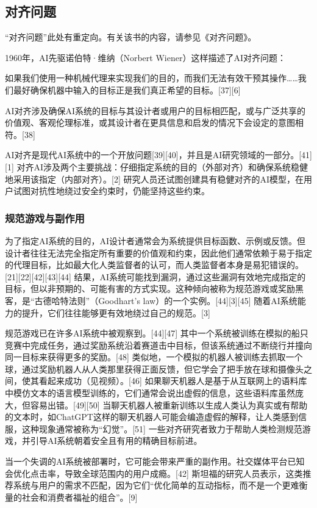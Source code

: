 \subsection{对齐问题}
“对齐问题”此处有重定向。有关该书的内容，请参见《对齐问题》。

1960年，AI先驱诺伯特·维纳（Norbert Wiener）这样描述了AI对齐问题：

如果我们使用一种机械代理来实现我们的目的，而我们无法有效干预其操作……我们最好确保机器中输入的目标正是我们真正希望的目标。[37][6]

AI对齐涉及确保AI系统的目标与其设计者或用户的目标相匹配，或与广泛共享的价值观、客观伦理标准，或其设计者在更具信息和启发的情况下会设定的意图相符。[38]

AI对齐是现代AI系统中的一个开放问题[39][40]，并且是AI研究领域的一部分。[41][1] 对齐AI涉及两个主要挑战：仔细指定系统的目的（外部对齐）和确保系统稳健地采用该指定（内部对齐）。[2] 研究人员还试图创建具有稳健对齐的AI模型，在用户试图对抗性地绕过安全约束时，仍能坚持这些约束。
\subsubsection{规范游戏与副作用}
为了指定AI系统的目的，AI设计者通常会为系统提供目标函数、示例或反馈。但设计者往往无法完全指定所有重要的价值观和约束，因此他们通常依赖于易于指定的代理目标，比如最大化人类监督者的认可，而人类监督者本身是易犯错误的。[21][22][42][43][44] 结果，AI系统可能找到漏洞，通过这些漏洞有效地完成指定的目标，但以非预期的、可能有害的方式实现。这种倾向被称为规范游戏或奖励黑客，是“古德哈特法则”（Goodhart's law）的一个实例。[44][3][45] 随着AI系统能力的提升，它们往往能够更有效地绕过自己的规范。[3]

规范游戏已在许多AI系统中被观察到。[44][47] 其中一个系统被训练在模拟的船只竞赛中完成任务，通过奖励系统沿着赛道击中目标，但该系统通过不断绕行并撞向同一目标来获得更多的奖励。[48] 类似地，一个模拟的机器人被训练去抓取一个球，通过奖励机器人从人类那里获得正面反馈，但它学会了把手放在球和摄像头之间，使其看起来成功（见视频）。[46] 如果聊天机器人是基于从互联网上的语料库中模仿文本的语言模型训练的，它们通常会说出虚假的信息，这些语料库虽然庞大，但容易出错。[49][50] 当聊天机器人被重新训练以生成人类认为真实或有帮助的文本时，如ChatGPT这样的聊天机器人可能会编造虚假的解释，让人类感到信服，这种现象通常被称为“幻觉”。[51] 一些对齐研究者致力于帮助人类检测规范游戏，并引导AI系统朝着安全且有用的精确目标前进。

当一个失调的AI系统被部署时，它可能会带来严重的副作用。社交媒体平台已知会优化点击率，导致全球范围内的用户成瘾。[42] 斯坦福的研究人员表示，这类推荐系统与用户的需求不匹配，因为它们“优化简单的互动指标，而不是一个更难衡量的社会和消费者福祉的组合”。[9]

